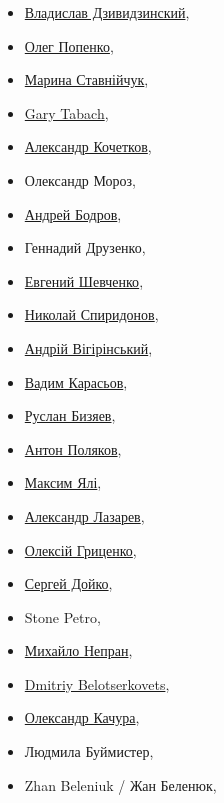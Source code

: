 \begin{multicols}{3}
\begin{itemize}
  \item \href{https://www.facebook.com/vladislav.dzividzinskiy}{Владислав Дзивидзинский},
  \item \href{https://www.facebook.com/profile.php?id=100001729759345}{Олег Попенко}, 
  \item \href{https://www.facebook.com/profile.php?id=100005289129370}{Марина Ставнійчук}, 
  \item \href{https://www.facebook.com/gary.tabach.33}{Gary Tabach}, 
  \item \href{https://www.facebook.com/Александр-Кочетков-277846527400654/}{Александр Кочетков}, 
  \item Олександр Мороз, 
  \item \href{https://www.facebook.com/profile.php?id=1673971989}{Андрей Бодров}, 
  \item Геннадий Друзенко, 
  \item \href{https://www.facebook.com/e.shevchenko76}{Евгений Шевченко}, 
  \item \href{https://www.facebook.com/nik.spiridonov.7}{Николай Спиридонов},
  \item \href{https://www.facebook.com/a.vigirinskiy}{Андрій Вігірінський}, 
  \item \href{https://www.facebook.com/vadim.karasev}{Вадим Карасьов},
  \item \href{https://www.facebook.com/ruslan.bizyaev.7}{Руслан Бизяев}, 
  \item \href{https://www.facebook.com/anton.polyakov.98}{Антон Поляков}, 
  \item \href{https://www.facebook.com/profile.php?id=100004292079149}{Максим Ялі}, 
  \item \href{https://www.facebook.com/profile.php?id=100008532614385}{Александр Лазарев}, 
  \item \href{https://www.facebook.com/grytsenko.alex}{Олексій Гриценко},
  \item \href{https://www.facebook.com/sdoyko}{Сергей Дойко}, 
  \item Stone Petro, 
  \item \href{https://www.facebook.com/TppNepran}{Михайло Непран}, 
  \item \href{https://www.facebook.com/dbelotserkovets}{Dmitriy Belotserkovets}, 
  \item \href{https://www.facebook.com/kachuratut}{Олександр Качура}, 
  \item Людмила Буймистер, 
  \item Zhan Beleniuk / Жан Беленюк, 

\end{itemize}
\end{multicols}
